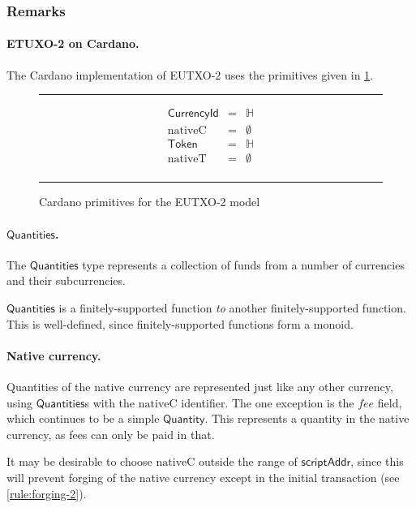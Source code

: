 \documentclass[a4paper]{article}
\newcommand{\s}{\textsf}  %
\newcommand{\msf}[1]{\ensuremath{\mathsf{#1}}}
\newcommand{\mi}[1]{\ensuremath{\mathit{#1}}}
\newcommand\rfskip{7pt}
\newenvironment{ruledfigure}[1]{\begin{figure}[#1]\hrule\vspace{\rfskip}}{\vspace{\rfskip}\hrule\end{figure}}
\newcommand{\scriptAddr}{\msf{scriptAddr}}
\newcommand{\fee}{\mi{fee}}
\newcommand{\qty}{\ensuremath{\s{Quantity}}}
\newcommand{\token}{\ensuremath{\s{Token}}}
\newcommand{\currency}{\ensuremath{\s{CurrencyId}}}
\newcommand{\nativeCur}{\ensuremath{\mathrm{nativeC}}}
\newcommand{\nativeTok}{\ensuremath{\mathrm{nativeT}}}
\newcommand{\qtymap}{\ensuremath{\s{Quantities}}}
\renewcommand\H{\ensuremath{\mathbb{H}}}
\newcommand{\emptyBs}{\ensuremath{\emptyset}}
\begin{document}
\subsubsection{Remarks}
\paragraph{ETUXO-2 on Cardano.}
The Cardano implementation of EUTXO-2 uses the primitives given in
\cref{fig:eutxo-2-types-cardano}.
\begin{ruledfigure}{H}
  \begin{displaymath}
    \begin{array}{rll}
      \currency  &=& \H\\
      \nativeCur &=& \emptyBs\\
      \token     &=& \H\\
      \nativeTok &=& \emptyBs\\
    \end{array}
  \end{displaymath}
  \caption{Cardano primitives for the EUTXO-2 model}
  \label{fig:eutxo-2-types-cardano}
\end{ruledfigure}

\paragraph{\qtymap{}. }
The \qtymap{} type represents a collection of funds from a
number of currencies and their subcurrencies.

\qtymap{} is a finitely-supported function \emph{to} another finitely-supported
function. This is well-defined, since finitely-supported functions form a monoid.

\paragraph{Native currency. }
Quantities of the native currency are represented just like any other currency,
using \qtymap{}s with the \nativeCur{} identifier. The one exception is the
\fee{} field, which continues to be a simple \qty{}. This represents a quantity
in the native currency, as fees can only be paid in that.

It may be desirable to choose \nativeCur{} outside the range
of \scriptAddr{}, since this will prevent forging of the native currency
except in the initial transaction (see \cref{rule:forging-2}).
\end{document}
